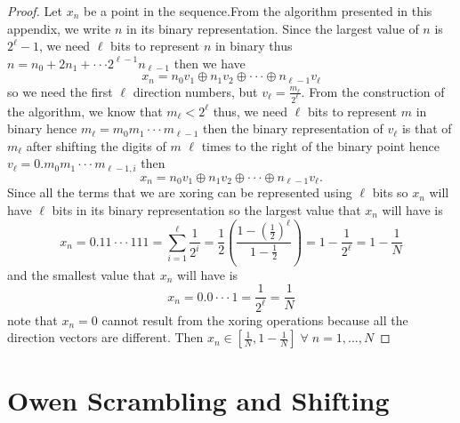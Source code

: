 \documentclass{article}
\theoremstyle{definition}
\begin{document}
\begin{appendices}
\begin{proof}
Let  $x_{n}$ be a point in the sequence.From the algorithm presented in this appendix, we write $n$ in its binary representation. Since the largest value of \(n\) is \(2^{\ell}-1\), we need \(\ell\) bits to represent \(n\) in binary thus \(n=n_0+2n_1+\cdot\cdot\cdot 2^{\ell-1}n_{\ell-1}\) then we have \begin{equation}
    x_{n}=n_0v_{1}\oplus n_1v_{2}\oplus\cdot\cdot\cdot\oplus n_{\ell-1}v_{\ell}
\end{equation} so we need the first $\ell$ direction numbers, but \(v_{\ell}=\frac{m_{\ell}}{2^{\ell}}\). From the construction of the algorithm, we know that \(m_{\ell}<2^{\ell}\) thus, we need \(\ell\) bits to represent $m$ in binary hence \(m_{\ell}=m_{0}m_{1}\cdot\cdot\cdot m_{\ell-1}\) then the binary representation of $v_{\ell}$ is that of $m_{\ell}$ after shifting the digits of $m$ $\ell$ times to the right of the binary point hence \(v_{\ell}=0.m_{0}m_{1}\cdot\cdot\cdot m_{\ell-1,i}\)
then \begin{equation}
    x_{n}=n_0v_{1}\oplus n_1v_{2}\oplus\cdot\cdot\cdot\oplus n_{\ell-1}v_{\ell}.
\end{equation}Since all the terms that we are xoring can be represented using $\ell$ bits so $x_{n}$ will have $\ell$ bits in its binary representation so the largest value that $x_{n}$ will have is \begin{equation}
x_{n}=0.11\cdot\cdot\cdot111=\sum_{i=1}^{\ell} \frac{1}{2^i}=\frac{1}{2}\left(\frac{1-(\frac{1}{2})^{\ell}}{1-\frac{1}{2}}\right)=1-\frac{1}{2^{\ell}}=1-\frac{1}{N}
\end{equation}
and the smallest value that $x_{n}$ will have is \begin{equation}
x_{n}=0.0\cdot\cdot\cdot1=\frac{1}{2^{\ell}}=\frac{1}{N}
\end{equation}
note that $x_{n}=0$ cannot result from the xoring operations because all the direction vectors are different. Then $x_{n}\in[\frac{1}{N},1-\frac{1}{N}]\;\forall \;n=1,\ldots,N$ 
\end{proof}

\section{Owen Scrambling and Shifting}


\end{appendices}
\end{document}
